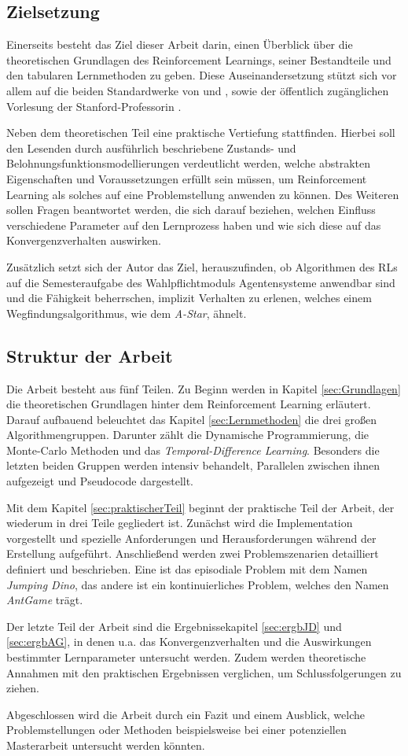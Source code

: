 \subsection{Zielsetzung}
Einerseits besteht das Ziel dieser Arbeit darin, einen Überblick über die theoretischen Grundlagen des Reinforcement Learnings, seiner Bestandteile und den tabularen Lernmethoden zu geben. Diese Auseinandersetzung stützt sich vor allem auf die beiden Standardwerke von \cite{Sutton1998} und \cite{Wiering}, sowie der öffentlich zugänglichen Vorlesung der Stanford-Professorin \cite{Brunskill}.
\par
Neben dem theoretischen Teil eine praktische Vertiefung stattfinden. Hierbei soll den Lesenden durch ausführlich beschriebene Zustands- und Belohnungsfunktionsmodellierungen verdeutlicht werden, welche abstrakten Eigenschaften und Voraussetzungen erfüllt sein müssen, um Reinforcement Learning als solches auf eine Problemstellung anwenden zu können.
Des Weiteren sollen Fragen beantwortet werden, die sich darauf beziehen, welchen Einfluss verschiedene Parameter auf den Lernprozess haben und wie sich diese auf das Konvergenzverhalten auswirken.
\par 
Zusätzlich setzt sich der Autor das Ziel, herauszufinden, ob Algorithmen des RLs auf die Semesteraufgabe des Wahlpflichtmoduls \glqq Agentensysteme\grqq{} anwendbar sind und die Fähigkeit beherrschen, implizit Verhalten zu erlenen, welches einem Wegfindungsalgorithmus, wie dem \textit{A-Star}, ähnelt.

\subsection{Struktur der Arbeit}
Die Arbeit besteht aus fünf Teilen. Zu Beginn werden in Kapitel \ref{sec:Grundlagen} die theoretischen Grundlagen hinter dem Reinforcement Learning erläutert. Darauf aufbauend beleuchtet das Kapitel \ref{sec:Lernmethoden} die drei großen Algorithmengruppen. Darunter zählt die Dynamische Programmierung, die Monte-Carlo Methoden und das \textit{Temporal-Difference Learning}. Besonders die letzten beiden Gruppen werden intensiv behandelt, Parallelen zwischen ihnen aufgezeigt und Pseudocode dargestellt.
\par 
Mit dem Kapitel \ref{sec:praktischerTeil} beginnt der praktische Teil der Arbeit, der wiederum in drei Teile gegliedert ist. Zunächst wird die Implementation vorgestellt und spezielle Anforderungen und Herausforderungen während der Erstellung aufgeführt. Anschließend werden zwei Problemszenarien detailliert definiert und beschrieben. Eine ist das episodiale Problem mit dem Namen \textit{Jumping Dino}, das andere ist ein kontinuierliches Problem, welches den Namen \textit{AntGame} trägt.
\par 
Der letzte Teil der Arbeit sind die Ergebnissekapitel \ref{sec:ergbJD} und \ref{sec:ergbAG}, in denen u.a. das Konvergenzverhalten und die Auswirkungen bestimmter Lernparameter untersucht werden. Zudem werden theoretische Annahmen mit den praktischen Ergebnissen verglichen, um Schlussfolgerungen zu ziehen.
\par 
Abgeschlossen wird die Arbeit durch ein Fazit und einem Ausblick, welche Problemstellungen oder Methoden beispielsweise bei einer potenziellen Masterarbeit untersucht werden könnten.